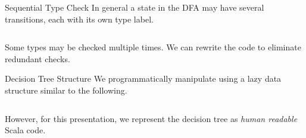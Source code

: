 \newsavebox\typecaseJhbox
\begin{lrbox}{\typecaseJhbox}
  \begin{minipage}{8cm}
    
  \end{minipage}
\end{lrbox}

\newsavebox\typecaseKbox
\begin{lrbox}{\typecaseKbox}
  \begin{minipage}{8cm}
    
  \end{minipage}
\end{lrbox}


\newsavebox\typecaseKhbox
\begin{lrbox}{\typecaseKhbox}
  \begin{minipage}{8cm}
    
  \end{minipage}
\end{lrbox}



\begin{frame}{Sequential Type Check}
  In general a state in the DFA may have several transitions, each with its own type label.
  \begin{columns}
    \begin{column}{0.5\textwidth}
      \usebox\typecaseAbox
    \end{column}
    \begin{column}{0.5\textwidth}  %
      \scalebox{0.9}{}
    \end{column}    
  \end{columns}

  Some types may be checked multiple times.  We can rewrite the code to eliminate redundant checks.
\end{frame}

\begin{frame}{Decision Tree Structure}
  We programmatically manipulate  using a lazy data structure similar to the following.

  \begin{columns}
    \begin{column}{0.5\textwidth}
      \usebox\typecaseAbox
    \end{column}
    \begin{column}{0.5\textwidth}  %
      \usebox\typecaseITEbox
    \end{column}    
  \end{columns}

  However, for this presentation, we represent the decision tree as \emph{human readable} Scala code.
\end{frame}



